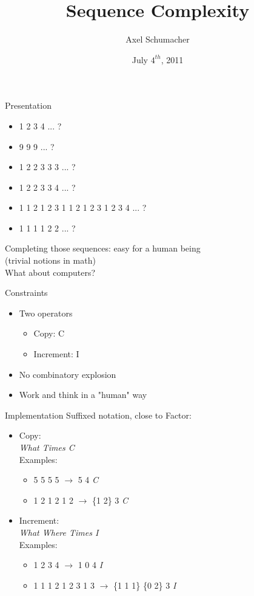 \documentclass{beamer}
\title[Free Project]{Sequence Complexity}
\author{Axel Schumacher}
\institute{Télécom Paristech}
\date{July $4^{th}$, 2011}
\begin{document}
\begin{frame}
  \titlepage
\end{frame}

\begin{frame}{Presentation}
  \begin{itemize}
    \item{1 2 3 4 ... ?}
    \item{9 9 9 ... ?}
    \item{1 2 2 3 3 3 ... ?}
    \item{1 2 2 3 3 4 ... ?}
    \item{1 1 2 1 2 3 1 1 2 1 2 3 1 2 3 4 ... ?}
    \item{1 1 1 1 2 2 ... ? }
  \end{itemize}
  \begin{center}
  Completing those sequences: easy for a human being\\
  (trivial notions in math)\\
  What about computers?
  \end{center}
\end{frame}

\begin{frame}{Constraints}
  \begin{itemize}
    \item{
      Two operators
      \begin{itemize}
        \item{Copy: C}
        \item{Increment: I}
      \end{itemize}}
    \item{No combinatory explosion}
    \item{Work and think in a "human" way}
  \end{itemize}
\end{frame}

\begin{frame}{Implementation}
  Suffixed notation, close to Factor:\\
  \begin{itemize}
    \item{
      Copy:\\
      \textit{What Times C}\\
      Examples:
      \begin{itemize}
        \item{5 5 5 5 $\rightarrow$ 5 4 \textit{C}}
        \item{1 2 1 2 1 2 $\rightarrow$ \{1 2\} 3 \textit{C}}
      \end{itemize}}
    \item{
      Increment:\\
      \textit{What Where Times I}\\
      Examples:
      \begin{itemize}
        \item{1 2 3 4 $\rightarrow$ 1 0 4 \textit{I}}
        \item{1 1 1 2 1 2 3 1 3 $\rightarrow$ \{1 1 1\} \{0 2\} 3 \textit{I}}
      \end{itemize}}
  \end{itemize}
\end{frame}
\end{document}

